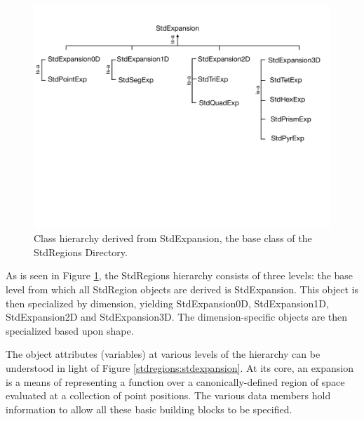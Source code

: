 \begin{figure}[htb]
\centering
\includegraphics[width=6in]{img/stdexpansiontree.pdf}
\caption{Class hierarchy derived from StdExpansion, the base class of the StdRegions Directory.}
\label{stdregions:stdexpansiontree}
\end{figure}

As is seen in Figure \ref{stdregions:stdexpansiontree}, the StdRegions hierarchy consists of three levels:  the base level from which all
StdRegion objects are derived is StdExpansion.   This object is then specialized by dimension, yielding StdExpansion0D, 
StdExpansion1D, StdExpansion2D and StdExpansion3D.  The dimension-specific objects are then specialized based upon
shape.  

The object attributes (variables) at various levels of the hierarchy can be understood in light of Figure \ref{stdregions:stdexpansion}.
At its core, an expansion is a means of representing a function over a canonically-defined region of space evaluated at a collection of point positions.
The various data members hold information to allow all these basic building blocks to be specified.

